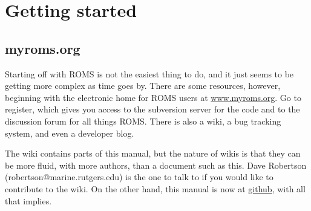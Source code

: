 \section{Getting started}
\label{Starting}

\subsection{myroms.org}
\label{Myroms}
Starting off with ROMS is not the easiest thing to do, and it just
seems to be getting more complex as time goes by. There are
some resources, however, beginning with the
electronic home for ROMS users at
\href{http://www.myroms.org}{www.myroms.org}. Go to register,
which gives you access to the subversion server for the code and to
the  discussion forum for all things ROMS. There is also a wiki,
a bug tracking system, and even a developer blog.

The wiki contains parts of this manual, but the nature of wikis is that
they can be more fluid, with more authors, than a document such as
this. Dave Robertson (robertson@marine.rutgers.edu) is the one to
talk to if you would like to contribute to the wiki. On the other
hand, this manual is now at
\href{https://github.com/kshedstrom/roms_manual}{github}, with all that
implies.

